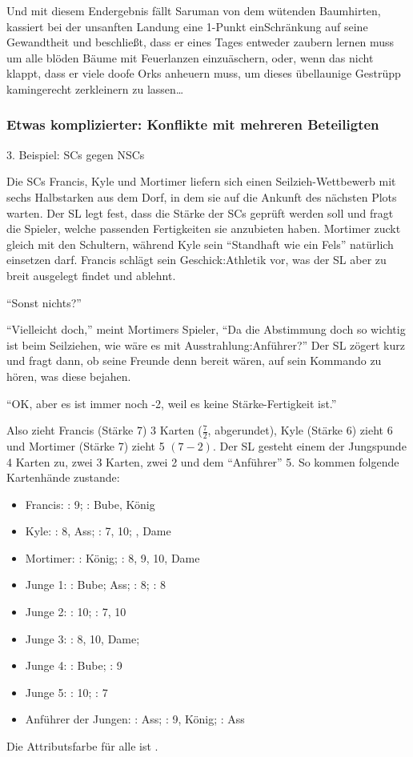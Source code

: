 Und mit diesem Endergebnis fällt Saruman von dem wütenden Baumhirten, kassiert bei der unsanften Landung eine 1-Punkt einSchränkung auf seine Gewandtheit und beschließt, dass er eines Tages entweder zaubern lernen muss um alle blöden Bäume mit Feuerlanzen einzuäschern, oder, wenn das nicht klappt, dass er viele doofe Orks anheuern muss, um dieses übellaunige Gestrüpp kamingerecht zerkleinern zu lassen\dots

\subsubsection {Etwas komplizierter: Konflikte mit mehreren Beteiligten}

3. Beispiel: SCs gegen NSCs

Die SCs Francis, Kyle und Mortimer liefern sich einen Seilzieh-Wettbewerb mit sechs Halbstarken aus dem Dorf, in dem sie auf die Ankunft des nächsten Plots warten. Der SL legt fest, dass die Stärke der SCs geprüft werden soll und fragt die Spieler, welche passenden Fertigkeiten sie anzubieten haben. Mortimer zuckt gleich mit den Schultern, während Kyle sein "`Standhaft wie ein Fels"' natürlich einsetzen darf. Francis schlägt sein Geschick:Athletik vor, was der SL aber zu breit ausgelegt findet und ablehnt.

"`Sonst nichts?"'

"`Vielleicht doch,"' meint Mortimers Spieler, "`Da die Abstimmung doch so wichtig ist beim Seilziehen, wie wäre es mit Ausstrahlung:Anführer?"'
Der SL zögert kurz und fragt dann, ob seine Freunde denn bereit wären, auf sein Kommando zu hören, was diese bejahen.

"`OK, aber es ist immer noch -2, weil es keine Stärke-Fertigkeit ist."'

Also zieht Francis (Stärke 7) 3 Karten (\(\frac{7}{2}\), abgerundet), Kyle (Stärke 6) zieht 6 und Mortimer (Stärke 7) zieht 5 \((7 - 2)\).
Der SL gesteht einem der Jungspunde 4 Karten zu, zwei 3 Karten, zwei 2 und dem "`Anführer"' 5.
So kommen folgende Kartenhände zustande:
\begin {itemize}
\item Francis: \herz: 9; \pik: Bube, König
\item Kyle: \karo: 8, Ass; \pik: 7, 10; , Dame
\item Mortimer: \herz: König; \kreuz: 8, 9, 10, Dame
\item Junge 1: \herz: Bube; Ass; \karo: 8; \pik: 8
\item Junge 2: \pik: 10; \kreuz: 7, 10
\item Junge 3: \herz: 8, 10, Dame;
\item Junge 4: \pik: Bube; \kreuz: 9
\item Junge 5: \karo: 10; \pik: 7
\item Anführer der Jungen: \herz: Ass; \karo: 9, König; \kreuz: Ass
\end {itemize}
Die Attributsfarbe für alle ist \kreuz.

